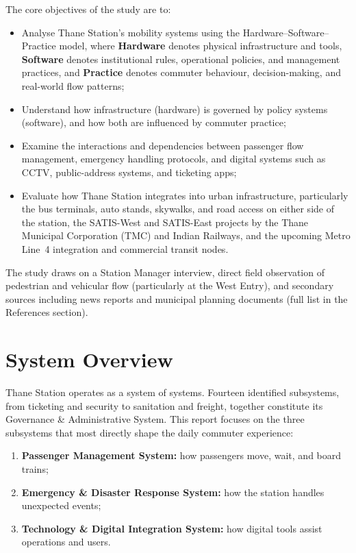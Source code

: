 \documentclass[11pt]{article}
\begin{document}
The core objectives of the study are to:
\begin{itemize}
  \item Analyse Thane Station's mobility systems using the Hardware--Software--Practice model,
  where \textbf{Hardware} denotes physical infrastructure and tools, \textbf{Software} denotes
  institutional rules, operational policies, and management practices, and \textbf{Practice}
  denotes commuter behaviour, decision-making, and real-world flow patterns;
  \item Understand how infrastructure (hardware) is governed by policy systems (software), and
  how both are influenced by commuter practice;
  \item Examine the interactions and dependencies between passenger flow management, emergency
  handling protocols, and digital systems such as CCTV, public-address systems, and ticketing
  apps;
  \item Evaluate how Thane Station integrates into urban infrastructure, particularly the bus
  terminals, auto stands, skywalks, and road access on either side of the station, the
  SATIS-West and SATIS-East projects by the Thane Municipal Corporation (TMC) and Indian
  Railways, and the upcoming Metro Line~4 integration and commercial transit nodes.
\end{itemize}

The study draws on a Station Manager interview, direct field observation of pedestrian and
vehicular flow (particularly at the West Entry), and secondary sources including news reports
and municipal planning documents (full list in the References section).

\section{System Overview}

Thane Station operates as a system of systems. Fourteen identified subsystems, from ticketing
and security to sanitation and freight, together constitute its Governance \& Administrative
System. This report focuses on the three subsystems that most directly shape the daily
commuter experience:
\begin{enumerate}
  \item \textbf{Passenger Management System:} how passengers move, wait, and board trains;
  \item \textbf{Emergency \& Disaster Response System:} how the station handles unexpected
  events;
  \item \textbf{Technology \& Digital Integration System:} how digital tools assist operations
  and users.
\end{enumerate}
\end{document}
